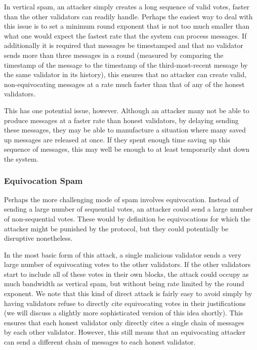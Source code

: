 \documentclass[12pt, fleqn]{article}
\begin{document}
In vertical spam, an attacker simply creates a long sequence of valid votes, faster than the other validators can readily handle. Perhaps the easiest way to deal with this issue is to set a minimum round exponent that is not too much smaller than what one would expect the fastest rate that the system can process messages. If additionally it is required that messages be timestamped and that no validator sends more than three messages in a round (measured by comparing the timestamp of the message to the timestamp of the third-most-recent message by the same validator in its history), this ensures that no attacker can create valid, non-equivocating messages at a rate much faster than that of any of the honest validators.

This has one potential issue, however. Although an attacker many not be able to produce messages at a faster rate than honest validators, by delaying sending these messages, they may be able to manufacture a situation where many saved up messages are released at once. If they spent enough time saving up this sequence of messages, this may well be enough to at least temporarily shut down the system.

\subsubsection{Equivocation Spam}

Perhaps the more challenging mode of spam involves equivocation. Instead of sending a large number of sequential votes, an attacker could send a large number of non-sequential votes. These would by definition be equivocations for which the attacker might be punished by the protocol, but they could potentially be disruptive nonetheless.

In the most basic form of this attack, a single malicious validator sends a very large number of equivocating votes to the other validators. If the other validators start to include all of these votes in their own blocks, the attack could occupy as much bandwidth as vertical spam, but without being rate limited by the round exponent. We note that this kind of direct attack is fairly easy to avoid simply by having validators refuse to directly cite equivocating votes in their justifications (we will discuss a slightly more sophisticated version of this idea shortly). This ensures that each honest validator only directly cites a single chain of messages by each other validator. However, this still means that an equivocating attacker can send a different chain of messages to each honest validator.
\end{document}

